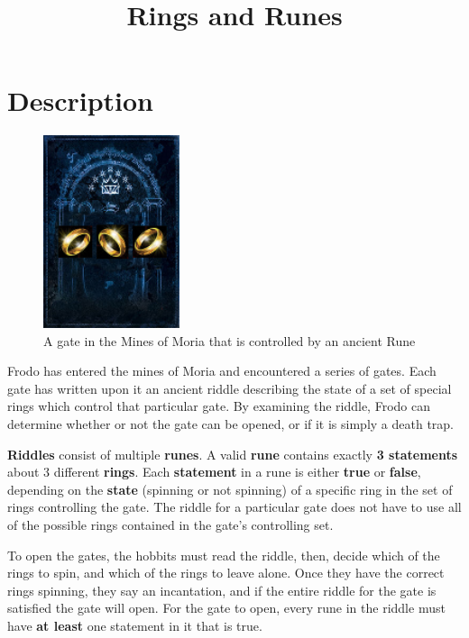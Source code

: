 \documentclass{article}
\title{ Rings and Runes }
\begin{document}
\date{}
\maketitle

\section{Description}

\begin{figure}
\vspace{-12pt}
\includegraphics[width=4cm]{RunesAndRings}
\centering
\caption{A gate in the Mines of Moria that is controlled by an ancient Rune}
\vspace{-12pt}
\end{figure}
Frodo has entered the mines of Moria and encountered a series of gates.  Each gate has written upon it an ancient riddle describing the state of a set of special rings which control that particular gate. By examining the riddle, Frodo can determine whether or not the gate can be opened, or if it is simply a death trap.

\textbf{Riddles} consist of multiple \textbf{runes}. A valid \textbf{rune} contains exactly \textbf{3 statements} about 3 different \textbf{rings}. Each \textbf{statement} in a rune is either \textbf{true} or \textbf{false}, depending on the \textbf{state} (spinning or not spinning) of a specific ring in the set of rings controlling the gate. The riddle for a particular gate does not have to use all of the possible rings contained in the gate's controlling set.

To open the gates, the hobbits must read the riddle, then, decide which of the rings to spin, and which of the rings to leave alone. Once they have the correct rings spinning, they say an incantation, and if the entire riddle for the gate is satisfied the gate will open. For the gate to open, every rune in the riddle must have \textbf{at least} one statement in it that is true. %
\end{document}
